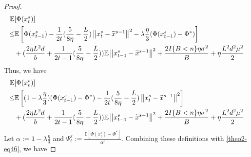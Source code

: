 \documentclass{article}
\newcommand*{\E}{\mathbb{E}}
\newcommand{\norm}[1]{\left\lVert#1\right\rVert}
\theoremstyle{definition}
\theoremstyle{remark}
\begin{document}
\begin{proof}
{\color{Brown}
\begin{align} 
\E&[\Phi({x}_{t}^s)] \notag
\\ \leq& \E\left[\Phi({x}_{t-1}^s)  -\frac{1}{2t}(\frac{5}{8\eta} - \frac{L}{2})\norm{{x}_t^s-\widetilde{x}^{s-1}}^2- \lambda\frac{\eta}{3}(\Phi({x}_{t-1}^s) - \Phi^*) \right]\notag\\
&+(\frac{2\eta L^2 d}{b}+\frac{1}{2t-1}(\frac{5}{8\eta} - \frac{L}{2}))\E\norm{x_{t-1}^s-\widetilde{x}^{s-1}}^2
+ \frac{2I\{B < n\}\eta \sigma ^2}{B}+\eta \frac{L^2 d^2 \mu^2}{2}
 \end{align}
 }
Thus, we have
{\color{Brown}
\begin{align} 
\E&[\Phi({x}_{t}^s)] \notag
\\ \leq& \E\left[ (1-\lambda\frac{\eta}{3})(\Phi({x}_{t-1}^s) - \Phi^*)   -\frac{1}{2t}(\frac{5}{8\eta} - \frac{L}{2})\norm{{x}_t^s-\widetilde{x}^{s-1}}^2\right]\notag\\
&+(\frac{2\eta L^2 d}{b}+\frac{1}{2t-1}(\frac{5}{8\eta} - \frac{L}{2}))\E\norm{x_{t-1}^s-\widetilde{x}^{s-1}}^2
+ \frac{2I\{B < n\}\eta \sigma ^2}{B}+\eta \frac{L^2 d^2 \mu^2}{2}\label{theo2-eq46}
 \end{align}
 }
Let {\color{Brown}$\alpha := 1 - \lambda\frac{\eta}{3}$} and $\Psi_t^s := \frac{\E[\Phi({x}_{t}^s)-\Phi^*]}{\alpha^t}$. Combining these definitions with \eqref{theo2-eq46}, we have  


\end{proof}
\end{document}

